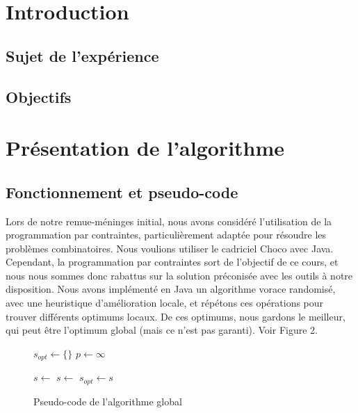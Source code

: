 \documentclass[10pt,a4paper]{article}
\begin{document}
\newpage

\hfill

\newpage

\tableofcontents

\newpage

\section{Introduction}

\subsection{Sujet de l'expérience}

\subsection{Objectifs}

\newpage

\section{Présentation de l'algorithme}

\subsection{Fonctionnement et pseudo-code}

Lors de notre remue-méninges initial, nous avons considéré l'utilisation de la programmation par contraintes, particulièrement adaptée pour résoudre les problèmes combinatoires. Nous voulions utiliser le cadriciel Choco avec Java.
Cependant, la programmation par contraintes sort de l'objectif de ce cours, et nous nous sommes donc rabattus sur la solution préconisée avec les outils à notre disposition. Nous avons implémenté en Java un algorithme vorace randomisé, avec une heuristique d'amélioration locale, et répétons ces opérations pour trouver différents optimums locaux. De ces optimums, nous gardons le meilleur, qui peut être l'optimum global (mais ce n'est pas garanti). Voir Figure 2.

\begin{figure}[h!]
\begin{algorithmic}

	\State $s_{opt}\gets \{\}$
	\State $p \gets \infty$
	
		\State $s \gets $ 
		\State $s \gets $ 
			\State $s_{opt}\gets s$
			\State {}
		\EndIf
	\EndWhile
\EndFunction

\end{algorithmic}
\caption{Pseudo-code de l'algorithme global}
\end{figure}
\end{document}
